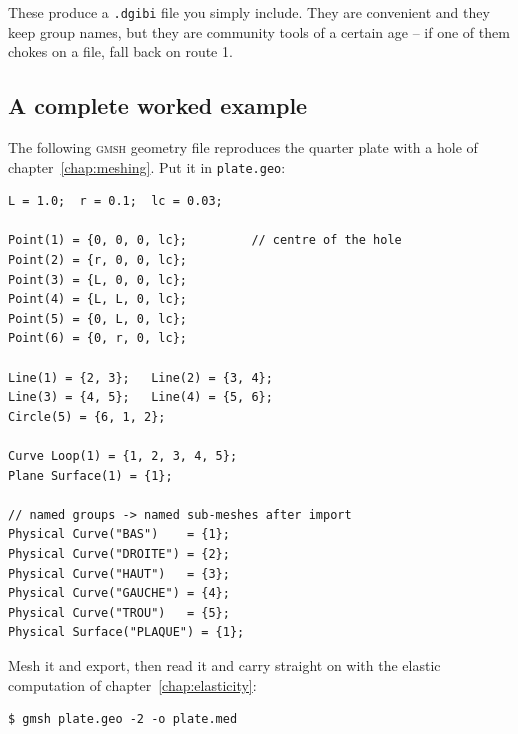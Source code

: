 \noindent These produce a \texttt{.dgibi} file you simply include. They are
convenient and they keep group names, but they are community tools of a
certain age -- if one of them chokes on a file, fall back on route 1.

\subsection{A complete worked example}

The following \textsc{gmsh} geometry file reproduces the quarter plate with a
hole of chapter~\ref{chap:meshing}. Put it in \texttt{plate.geo}:

\begin{codebox}
\begin{verbatim}
L = 1.0;  r = 0.1;  lc = 0.03;

Point(1) = {0, 0, 0, lc};         // centre of the hole
Point(2) = {r, 0, 0, lc};
Point(3) = {L, 0, 0, lc};
Point(4) = {L, L, 0, lc};
Point(5) = {0, L, 0, lc};
Point(6) = {0, r, 0, lc};

Line(1) = {2, 3};   Line(2) = {3, 4};
Line(3) = {4, 5};   Line(4) = {5, 6};
Circle(5) = {6, 1, 2};

Curve Loop(1) = {1, 2, 3, 4, 5};
Plane Surface(1) = {1};

// named groups -> named sub-meshes after import
Physical Curve("BAS")    = {1};
Physical Curve("DROITE") = {2};
Physical Curve("HAUT")   = {3};
Physical Curve("GAUCHE") = {4};
Physical Curve("TROU")   = {5};
Physical Surface("PLAQUE") = {1};
\end{verbatim}
\end{codebox}

\noindent Mesh it and export, then read it and carry straight on with the
elastic computation of chapter~\ref{chap:elasticity}:

\begin{codebox}
\begin{verbatim}
$ gmsh plate.geo -2 -o plate.med
\end{verbatim}
\end{codebox}

